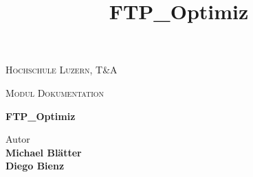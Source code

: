 
\begin{center}
\vspace{1.5cm}
{\scshape\LARGE Hochschule Luzern, T\&A \par}
{\scshape\Large Modul Dokumentation\par}
\vspace{2.0cm}
\title{FTP\_Optimiz}
{\huge\bfseries FTP\_Optimiz\par}

\vspace{16.0cm}

\end{center}

Autor \\
\textbf{Michael Blätter} \\
\textbf{Diego Bienz} \\


